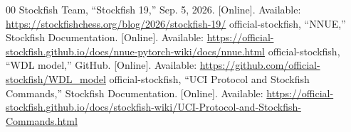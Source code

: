 \documentclass[10pt,conference]{IEEEtran}
\begin{document}
\begin{thebibliography}{00}
 Stockfish Team, ``Stockfish 19,'' Sep. 5, 2026. [Online]. Available: \url{https://stockfishchess.org/blog/2026/stockfish-19/}
 official-stockfish, ``NNUE,'' Stockfish Documentation. [Online]. Available: \url{https://official-stockfish.github.io/docs/nnue-pytorch-wiki/docs/nnue.html}
 official-stockfish, ``WDL model,'' GitHub. [Online]. Available: \url{https://github.com/official-stockfish/WDL_model}
 official-stockfish, ``UCI Protocol and Stockfish Commands,'' Stockfish Documentation. [Online]. Available: \url{https://official-stockfish.github.io/docs/stockfish-wiki/UCI-Protocol-and-Stockfish-Commands.html}
\end{thebibliography}
\end{document}
